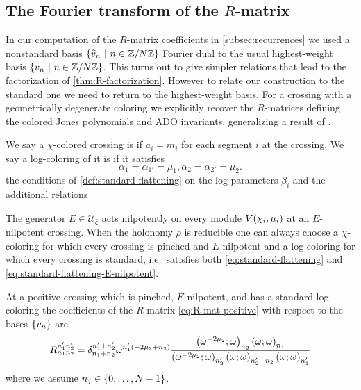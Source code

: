 \documentclass{sl2ams}
\numberwithin{equation}{section}
\newcommand{\U}{\mathcal{U}}
\begin{document}
\subsection{The Fourier transform of the \texorpdfstring{\(R\)}{R}-matrix}
\label{sec:fourier-transform-R-mat}
In our computation of the \(R\)-matrix coefficients in \cref{subsec:recurrences} we used a nonstandard basis \(\set{\vbh n \given n \in \mathbb{Z}/\nr \mathbb{Z}}\) Fourier dual to the usual highest-weight basis \(\set{\vb n \given n \in \mathbb{Z}/\nr \mathbb{Z}}\).
This turns out to give simpler relations that lead to the factorization of \cref{thm:R-factorization}.
However to relate our construction to the standard one we need to return to the highest-weight basis.
For a crossing with a geometrically degenerate coloring we explicitly recover the \(R\)-matrices defining the colored Jones polynomials and ADO invariants, generalizing a result of \textcite{Murakami2001}.

\begin{definition}
  We say a \(\chi\)-colored crossing is  if \(a_{i} = m_{i}\) for each segment \(i\) at the crossing.
  We say a log-coloring of it is  if it satisfies
  \begin{equation}
    \label{eq:standard-flattening-E-nilpotent}
    \alpha_{1} = \alpha_{1'} = \mu_{1}, \alpha_{2} = \alpha_{2'} = \mu_{2}.
  \end{equation}
 the conditions of \cref{def:standard-flattening} on the log-parameters \(\beta_{i}\) and the additional relations
\end{definition}

The generator \(E \in \U_{\xi}\) acts nilpotently on every module \(V\mathopen{}\left(\chi_{i}, \mu_{i}\right)\) at an \(E\)-nilpotent crossing.
When the holonomy \(\rho\) is reducible one can always choose a \(\chi\)-coloring for which every crossing is pinched and \(E\)-nilpotent \cite{McPhailSnyderVolume} and a log-coloring for which every crossing is standard, i.e.\ satisfies both \eqref{eq:standard-flattening} and \eqref{eq:standard-flattening-E-nilpotent}.

\begin{theorem}
  \label{thm:pinched-R-matrix-dual}
  At a positive crossing which is pinched, \(E\)-nilpotent, and has a standard log-coloring the coefficients of the \(R\)-matrix \eqref{eq:R-mat-positive} with respect to the bases \(\set{\vb{n}}\) are
  \begin{equation}
    \label{eq:nilpotent-R-matrix-dual}
    R_{n_1 n_2}^{n_1' n_2'}
    =
    \del{n_1 + n_2}{n_1' +  n_2'}
    \omega^{n_1'(-2 \mu_2 + n_2)}
    \frac{
      \qp{\omega^{-2\mu_2}}{n_2}
      \qp{\omega}{n_1}
      }{
      \qp{\omega^{-2\mu_2}}{n_2'}
      \qp{\omega}{n_2' - n_2}
      \qp{\omega}{n_1'}
    }
  \end{equation}
  where we assume \(n_j \in \set{0, \dots, \nr -1}\).
\end{theorem}
\end{document}
